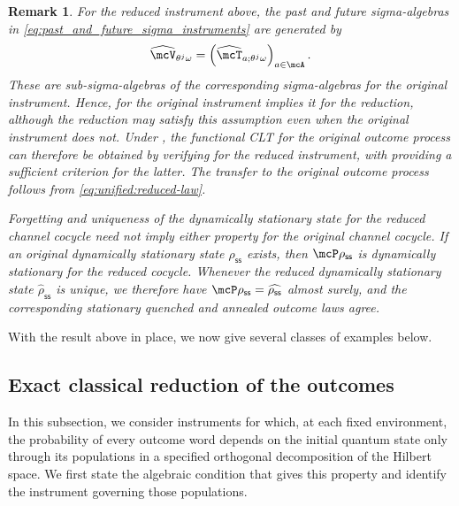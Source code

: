 \documentclass[a4paper]{article}
\numberwithin{equation}{section}   %
\theoremstyle{plain}   %
\theoremstyle{plain}   %
\newtheorem{remark}[lemma]{Remark}   %
\theoremstyle{examplestyle}
\newcommand{\s}{\rho_{\mathsf{ss}}}     %
\begin{document}
\begin{remark}
    For the reduced instrument above, the past and future sigma-algebras in \eqref{eq:past_and_future_sigma_instruments} are generated by
    \[
        \widehat{\mcV}_{\theta^j\omega}
        =
        \left(\widehat{\mcT}_{a;\theta^j\omega}\right)_{a\in\mcA}.
    \]
    These are sub-sigma-algebras of the corresponding sigma-algebras for the original instrument. 
    Hence,  for the original instrument implies it for the reduction, although the reduction may satisfy this assumption even when the original instrument does not.
    Under , the functional CLT for the original outcome process can therefore be obtained by verifying  for the reduced instrument, with  providing a sufficient criterion for the latter.
    The transfer to the original outcome process follows from \eqref{eq:unified:reduced-law}.

    Forgetting and uniqueness of the dynamically stationary state for the reduced channel cocycle need not imply either property for the original channel cocycle. If an original dynamically stationary state $\s$ exists, then $\mcP \s$ is dynamically stationary for the reduced cocycle.
    Whenever the reduced dynamically stationary state $\widehat \s$  is unique, we therefore have $\mcP \s=\widehat{\s}$ almost surely, and the corresponding stationary quenched and annealed outcome laws agree.
\end{remark}

With the result above in place, we now give several classes of examples below. 


\subsection{Exact classical reduction of the outcomes}
\label{subsec:unified:classical}


    In this subsection, we consider instruments for which, at each fixed environment, the probability of every outcome word depends on the initial quantum state only through its populations in a specified orthogonal decomposition of the Hilbert space. 
    We first state the algebraic condition that gives this property and identify the instrument governing those populations.
    
\end{document}
